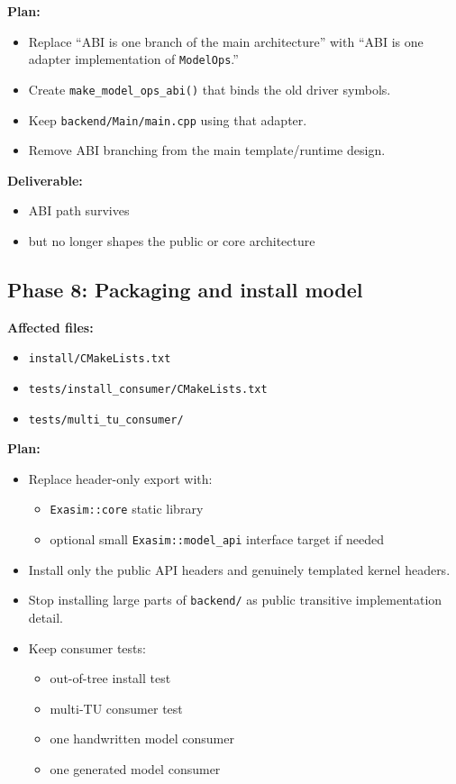 \documentclass[11pt]{article}
\begin{document}
\textbf{Plan:}
\begin{itemize}[leftmargin=*]
\item Replace ``ABI is one branch of the main architecture'' with ``ABI is one adapter implementation of \texttt{ModelOps}.''
\item Create \texttt{make\_model\_ops\_abi()} that binds the old driver symbols.
\item Keep \texttt{backend/Main/main.cpp} using that adapter.
\item Remove ABI branching from the main template/runtime design.
\end{itemize}

\textbf{Deliverable:}
\begin{itemize}[leftmargin=*]
\item ABI path survives
\item but no longer shapes the public or core architecture
\end{itemize}

\subsection*{Phase 8: Packaging and install model}

\textbf{Affected files:}
\begin{itemize}[leftmargin=*]
\item \texttt{install/CMakeLists.txt}
\item \texttt{tests/install\_consumer/CMakeLists.txt}
\item \texttt{tests/multi\_tu\_consumer/}
\end{itemize}

\textbf{Plan:}
\begin{itemize}[leftmargin=*]
\item Replace header-only export with:
\begin{itemize}[leftmargin=*]
\item \texttt{Exasim::core} static library
\item optional small \texttt{Exasim::model\_api} interface target if needed
\end{itemize}
\item Install only the public API headers and genuinely templated kernel headers.
\item Stop installing large parts of \texttt{backend/} as public transitive implementation detail.
\item Keep consumer tests:
\begin{itemize}[leftmargin=*]
\item out-of-tree install test
\item multi-TU consumer test
\item one handwritten model consumer
\item one generated model consumer
\end{itemize}
\end{itemize}
\end{document}
